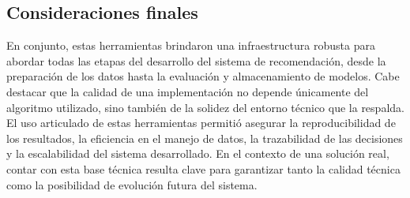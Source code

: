 \subsection{Consideraciones finales}

En conjunto, estas herramientas brindaron una infraestructura robusta para abordar todas las etapas del desarrollo del sistema de recomendación, desde la preparación de los datos hasta la evaluación y almacenamiento de modelos. Cabe destacar que la calidad de una implementación no depende únicamente del algoritmo utilizado, sino también de la solidez del entorno técnico que la respalda. El uso articulado de estas herramientas permitió asegurar la reproducibilidad de los resultados, la eficiencia en el manejo de datos, la trazabilidad de las decisiones y la escalabilidad del sistema desarrollado. En el contexto de una solución real, contar con esta base técnica resulta clave para garantizar tanto la calidad técnica como la posibilidad de evolución futura del sistema.









